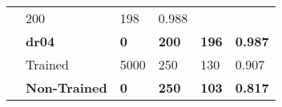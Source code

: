 \begin{table}[tb]
{\begin{tabular}{C{0.7cm}C{2cm}C{1.5cm}C{1.6cm}C{1.5cm}C{1.5cm}}
& 200                                            
& 198                                           
& 0.988    
\\  
& \textbf{dr04}                   
& \textbf{0}                                         
& \textbf{200}                                            
& \textbf{196}                                           
& \textbf{0.987}                                      
\\ \hline 
{}
& Trained 
& 5000
& 250                                            
& 130                                           
& 0.907                                            
\\  
& \textbf{Non-Trained}                   
& \textbf{0}                                         
& \textbf{250}                                            
& \textbf{103}                                           
& \textbf{0.817}                                      
\\ \hline
\end{tabular}
}
\vspace{-5mm}
\end{table}